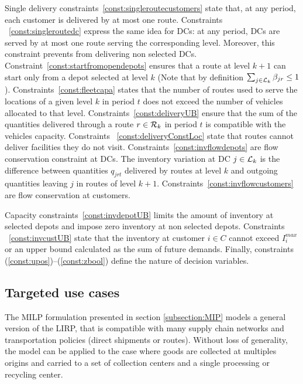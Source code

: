 \documentclass[a4paper,10pt]{article}
\begin{document}
\begin{linenumbers}
Single delivery constraints~\eqref{const:singleroutecustomers} state that, at any period, each customer is delivered by at most one route. 
%
Constraints ~\eqref{const:singleroutedc} express the same idea for DCs: at any period, DCs are served by at most one route serving the corresponding level. Moreover, this constraint prevents from delivering non selected DCs. 
%
Constraint~\eqref{const:startfromopendepots} ensures that a route at level $k+1$ can start only from a depot selected at level $k$ (Note that by definition $\sum_{j\in\mathcal{L}_{k}} \beta_{jr} \leq 1$).
%
Constraints~\eqref{const:fleetcapa} states that the number of routes used to serve the locations of a given level $k$ in period $t$ does not exceed the number of vehicles allocated to that level. 
%
Constraints~\eqref{const:deliveryUB} ensure that the sum of the quantities delivered through a route $r\in\mathcal{R}_k$ in period $t$ is compatible with the vehicles capacity. 
%
Constraints ~\eqref{const:deliveryConstLoc}  state that routes cannot deliver facilities they do not visit. 
%
Constraints~\eqref{const:invflowdepots} are flow conservation constraint at DCs. 
The inventory variation at DC $j \in \mathcal{L}_k$ is the difference between quantities $q_{jrt}$ delivered by routes at level $k$ and outgoing quantities leaving $j$ in routes of level $k+1$. 
%
Constraints~\eqref{const:invflowcustomers} are flow conservation at customers.

%
Capacity constraints~\eqref{const:invdepotUB} limits the amount of inventory at selected depots and impose zero inventory at non selected depots. 
%
Constraints ~\eqref{const:invcustUB} state that the inventory at customer $i \in C$ cannot exceed $I_i^{max}$ or an upper bound calculated as the sum of future demands. 
%
Finally, constraints (\ref{const:upos})--(\ref{const:zbool}) define the nature of decision variables. 




\subsection{Targeted use cases}

The MILP formulation presented in section \ref{subsection:MIP} models a general version of the LIRP, 
that is compatible with many supply chain networks and transportation policies (direct shipments or routes). 
Without loss of generality, the model can be applied to the case where goods are collected at multiples origins and carried to a set of collection centers and a single processing or recycling center. 


\end{linenumbers}
\end{document}
